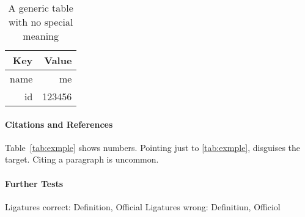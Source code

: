 \documentclass{scrartcl}
\begin{document}
\begin{table}
	\centering
    \begin{tabular}{@{}rr@{}} 
    \textbf{Key}  & \textbf{Value} \\ \hline
    name & me \\
    id & 123456\\
    \end{tabular}
    \caption{
        A generic table with no special meaning
    }
    \label{tab:example}
\end{table}


\paragraph{Citations and References}
Table~\ref{tab:exmple} shows numbers.
Pointing just to \ref{tab:exmple}, disguises the target.
Citing a paragraph is uncommon. \cite{my:paper}




\paragraph{Further Tests}
Ligatures correct: Deﬁnition, Oﬀicial
Ligatures wrong: Deﬁnitiun, Oﬀiciol
\end{document}
